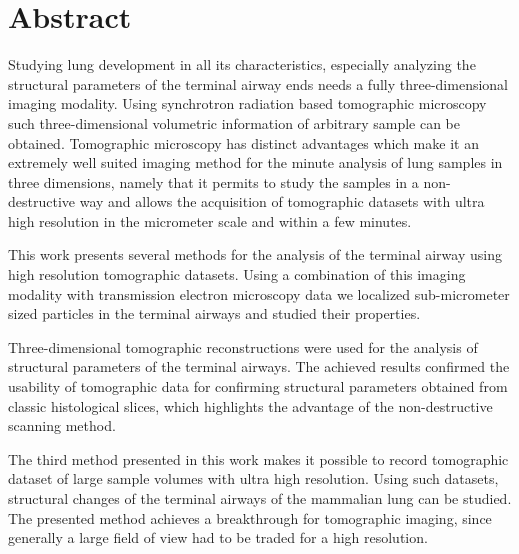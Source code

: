 %
\begingroup%
\let\clearpage\relax%
\let\cleardoublepage\relax%
\let\cleardoublepage\relax%
\chapter*{Abstract}%
Studying lung development in all its characteristics, especially analyzing the structural parameters of the terminal airway ends needs a fully three-dimensional imaging modality. Using synchrotron radiation based tomographic microscopy such three-dimensional volumetric information of arbitrary sample can be obtained. Tomographic microscopy has distinct advantages which make it an extremely well suited imaging method for the minute analysis of lung samples in three dimensions, namely that it permits to study the samples in a non-destructive way and allows the acquisition of tomographic datasets with ultra high resolution in the micrometer scale and within a few minutes.

This work presents several methods for the analysis of the terminal airway using high resolution tomographic datasets. Using a combination of this imaging modality with transmission electron microscopy data we localized sub-micrometer sized particles in the terminal airways and studied their properties.

Three-dimensional tomographic reconstructions were used for the analysis of structural parameters of the terminal airways. The achieved results confirmed the usability of tomographic data for confirming structural parameters obtained from classic histological slices, which highlights the advantage of the non-destructive scanning method.

The third method presented in this work makes it possible to record tomographic dataset of large sample volumes with ultra high resolution. Using such datasets, structural changes of the terminal airways of the mammalian lung can be studied. The presented method achieves a breakthrough for tomographic imaging, since generally a large field of view had to be traded for a high resolution.
\endgroup%